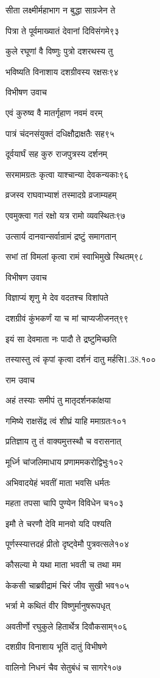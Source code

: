 सीता लक्ष्मीर्महाभाग न बुद्धा साग्रजेन ते

पित्रा ते पूर्वमाख्यातं देवानां दिविसंगमे९३

कुले रघूणां वै विष्णुः पुत्रो दशरथस्य तु

भविष्यति विनाशाय दशग्रीवस्य रक्षसः९४

विभीषण उवाच

एवं कुरुष्व वै मातर्गृहाण नवमं वरम्

पात्रं चंदनसंयुक्तं दधिक्षौद्राक्षतैः सह९५

दूर्वयार्घं सह कुरु राजपुत्रस्य दर्शनम्

सरमामग्रतः कृत्वा याश्चान्या देवकन्यकाः९६

व्रजस्व राघवाभ्याशं तस्मादग्रे व्रजाम्यहम्

एवमुक्त्वा गतं रक्षो यत्र रामो व्यवस्थितः९७

उत्सार्य दानवान्सर्वान्रामं द्रष्टुं समागतान्

सभां तां विमलां कृत्वा रामं स्वाभिमुखे स्थितम्९८

विभीषण उवाच

विज्ञाप्यं शृणु मे देव वदतश्च विशांपते

दशग्रीवं कुंभकर्णं या च मां चाप्यजीजनत्९९

इयं सा देवमाता नः पादौ ते द्रष्टुमिच्छति

तस्यास्तु त्वं कृपां कृत्वा दर्शनं दातु मर्हसि1.38.१००

राम उवाच

अहं तस्याः समीपं तु मातृदर्शनकांक्षया

गमिष्ये राक्षसेंद्र त्वं शीघ्रं याहि ममाग्रतः१०१

प्रतिज्ञाय तु तं वाक्यमुत्तस्थौ च वरासनात्

मूर्ध्नि चांजलिमाधाय प्रणाममकरोद्विभुः१०२

अभिवादयेहं भवतीं माता भवसि धर्मतः

महता तपसा चापि पुण्येन विविधेन च१०३

इमौ ते चरणौ देवि मानवो यदि पश्यति

पूर्णस्स्यात्तदहं प्रीतो दृष्ट्वेमौ पुत्रवत्सले१०४

कौसल्या मे यथा माता भवती च तथा मम

केकसी चाब्रवीद्रामं चिरं जीव सुखी भव१०५

भर्त्रा मे कथितं वीर विष्णुर्मानुषरूपधृत्

अवतीर्णो रघुकुले हितार्थेत्र दिवौकसाम्१०६

दशग्रीव विनाशाय भूतिं दातुं विभीषणे

वालिनो निधनं चैव सेतुबंधं च सागरे१०७

